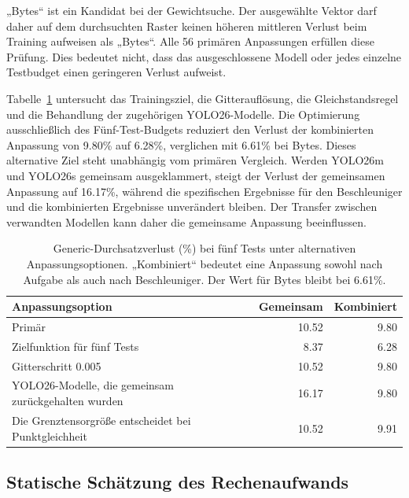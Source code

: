 „Bytes“ ist ein Kandidat bei der Gewichtsuche. Der ausgewählte Vektor darf daher auf dem durchsuchten Raster keinen höheren mittleren Verlust beim Training aufweisen als „Bytes“. Alle 56 primären Anpassungen erfüllen diese Prüfung. Dies bedeutet nicht, dass das ausgeschlossene Modell oder jedes einzelne Testbudget einen geringeren Verlust aufweist.

Tabelle~\ref{tab:appendix:generic_fit_sensitivity} untersucht das Trainingsziel, die Gitterauflösung, die Gleichstandsregel und die Behandlung der zugehörigen YOLO26-Modelle. Die Optimierung ausschließlich des Fünf-Test-Budgets reduziert den Verlust der kombinierten Anpassung von \num{9.80}\% auf \num{6.28}\%, verglichen mit \num{6.61}\% bei Bytes. Dieses alternative Ziel steht unabhängig vom primären Vergleich. Werden YOLO26m und YOLO26s gemeinsam ausgeklammert, steigt der Verlust der gemeinsamen Anpassung auf \num{16.17}\%, während die spezifischen Ergebnisse für den Beschleuniger und die kombinierten Ergebnisse unverändert bleiben. Der Transfer zwischen verwandten Modellen kann daher die gemeinsame Anpassung beeinflussen.

\begin{table}[!htb]
\centering\small\TableSetup
\caption{Generic-Durchsatzverlust (\%) bei fünf Tests unter alternativen Anpassungsoptionen. „Kombiniert“ bedeutet eine Anpassung sowohl nach Aufgabe als auch nach Beschleuniger. Der Wert für Bytes bleibt bei \num{6.61}\%.}
\label{tab:appendix:generic_fit_sensitivity}
\begin{tabular}{@{}lrr@{}}
\toprule
Anpassungsoption & Gemeinsam & Kombiniert \\
\midrule
Primär & \num{10.52} & \num{9.80} \\
Zielfunktion für fünf Tests & \num{8.37} & \num{6.28} \\
Gitterschritt \num{0.005} & \num{10.52} & \num{9.80} \\
YOLO26-Modelle, die gemeinsam zurückgehalten wurden & \num{16.17} & \num{9.80} \\
Die Grenztensorgröße entscheidet bei Punktgleichheit & \num{10.52} & \num{9.91} \\
\bottomrule
\end{tabular}
\end{table}

\subsection{Statische Schätzung des Rechenaufwands}
\label{sec:implementation}

